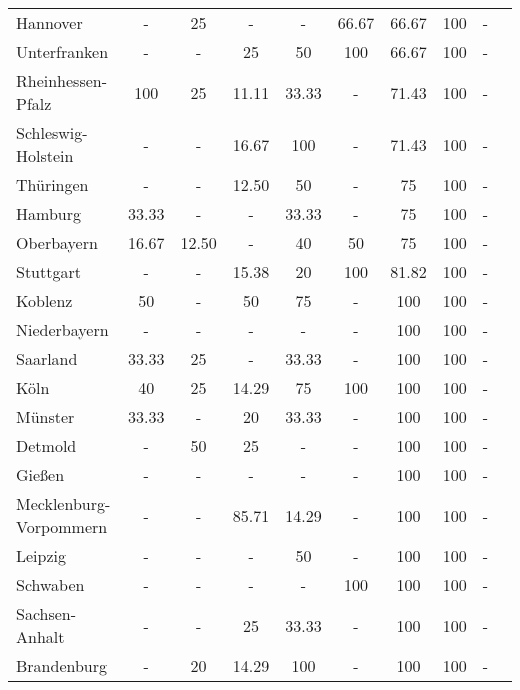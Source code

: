 \begin{table}[H]
\begin{tabularx}{\textwidth}{Xccccccccc}
            Hannover & - & 25 & - & - & 66.67 & 66.67 & 100 & - \\
            Unterfranken & - & - & 25 & 50 & 100 & 66.67 & 100 & - \\
            Rheinhessen-Pfalz & 100 & 25 & 11.11 & 33.33 & - & 71.43 & 100 & - \\
            Schleswig-Holstein & - & - & 16.67 & 100 & - & 71.43 & 100 & - \\
            Thüringen & - & - & 12.50 & 50 & - & 75 & 100 & - \\
            Hamburg & 33.33 & - & - & 33.33 & - & 75 & 100 & - \\
            Oberbayern & 16.67 & 12.50 & - & 40 & 50 & 75 & 100 & - \\
            Stuttgart & - & - & 15.38 & 20 & 100 & 81.82 & 100 & - \\
            Koblenz & 50 & - & 50 & 75 & - & 100 & 100 & - \\
            Niederbayern & - & - & - & - & - & 100 & 100 & - \\
            Saarland & 33.33 & 25 & - & 33.33 & - & 100 & 100 & - \\
            Köln & 40 & 25 & 14.29 & 75 & 100 & 100 & 100 & - \\
            Münster & 33.33 & - & 20 & 33.33 & - & 100 & 100 & - \\
            Detmold & - & 50 & 25 & - & - & 100 & 100 & - \\
            Gießen & - & - & - & - & - & 100 & 100 & - \\
            Mecklenburg-Vorpommern & - & - & 85.71 & 14.29 & - & 100 & 100 & - \\
            Leipzig & - & - & - & 50 & - & 100 & 100 & - \\
            Schwaben & - & - & - & - & 100 & 100 & 100 & - \\
            Sachsen-Anhalt & - & - & 25 & 33.33 & - & 100 & 100 & - \\
            Brandenburg & - & 20 & 14.29 & 100 & - & 100 & 100 & - \\
        \bottomrule
    \end{tabularx}
\end{table}
    